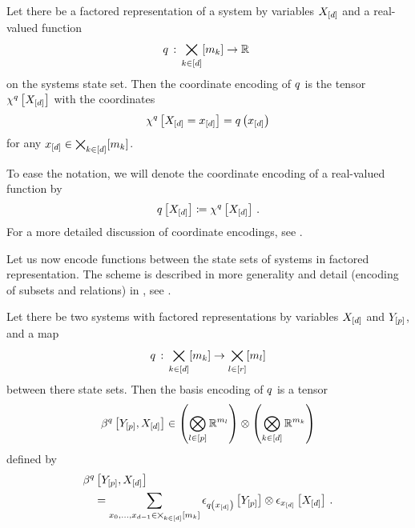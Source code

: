 \begin{definition}\label{def:notationCoordinateEncoding}
	Let there be a factored representation of a system by variables $X_{[d]}$ and a real-valued function
	\begin{align*}
		q\,:\,\bigtimes_{k\in[d]}[m_{k}] \rightarrow \mathbb{R} \
	\end{align*}
	on the systems state set.
	Then the coordinate encoding of $q$ is the tensor $\chi^{q}\left[X_{[d]}\right]$ with the coordinates
	\begin{align*}
		\chi^{q}\left[X_{[d]}=x_{[d]}\right] = q\left(x_{[d]}\right)
	\end{align*}
	for any $x_{[d]}\in\bigtimes_{k\in[d]}[m_{k}]$.
\end{definition}

To ease the notation, we will denote the coordinate encoding of a real-valued function by
\begin{align*}
	q\left[X_{[d]}\right]
	\coloneqq \chi^{q}\left[X_{[d]}\right] \, .
\end{align*}
For a more detailed discussion of coordinate encodings, see .



Let us now encode functions between the state sets of systems in factored representation.
The scheme is described in more generality and detail (encoding of subsets and relations) in , see .

\begin{definition}\label{def:functionRepresentation}
	Let there be two systems with factored representations by variables $X_{[d]}$ and $Y_{[p]}$, and a map
	\begin{align*}
		 q\,:\,\bigtimes_{k\in[d]}[m_{k}] \rightarrow  \bigtimes_{l\in[r]}[m_{l}]
	\end{align*}
	between there state sets.
	Then the basis encoding of $q$ is a tensor
	\begin{align*}
		\beta^{q}\left[Y_{[p]},X_{[d]}\right]
		\in \left(\bigotimes_{l\in[p]} \mathbb{R}^{m_{l}}\right) \otimes \left(\bigotimes_{k\in[d]} \mathbb{R}^{m_{k}}\right)
	\end{align*}
	defined by
	\begin{align*}
		& \beta^{q}\left[Y_{[p]},X_{[d]}\right] \\
		& \quad = \sum_{x_{0},\ldots,x_{d-1}\in\bigtimes_{k\in[d]}[m_{k}]}
		\epsilon_{q\left(x_{[d]}\right)}\left[Y_{[p]}\right] \otimes  \epsilon_{x_{[d]}}\left[X_{[d]}\right] \, .
	\end{align*}
\end{definition}

